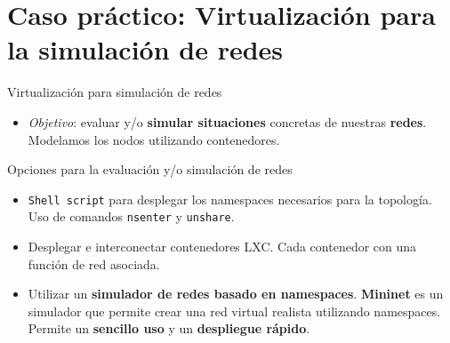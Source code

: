 \documentclass[aspectratio=169,xcolor=dvipsnames]{beamer}
\begin{document}
	
	\section{Caso práctico: Virtualización para la simulación de redes}
	
	\begin{frame}{Virtualización para simulación de redes}
		\begin{itemize}
		    \item \textit{Objetivo}: evaluar y/o \textbf{simular situaciones} concretas de nuestras \textbf{redes}. Modelamos los nodos utilizando contenedores.
		\end{itemize}
		
		\begin{block}{Opciones para la evaluación y/o simulación de redes}
		    \begin{itemize}
		        \item \texttt{Shell script} para desplegar los namespaces necesarios para la topología. Uso de comandos \texttt{nsenter} y \texttt{unshare}.
		        
		        \item Desplegar e interconectar contenedores LXC. Cada contenedor con una función de red asociada.
		        
		        \item Utilizar un \textbf{simulador de redes basado en namespaces}. \textbf{Mininet} es un simulador que permite crear una red virtual realista utilizando namespaces. Permite un \textbf{sencillo uso} y un \textbf{despliegue rápido}.
		    \end{itemize}
		\end{block}
	\end{frame}
	
\end{document}
